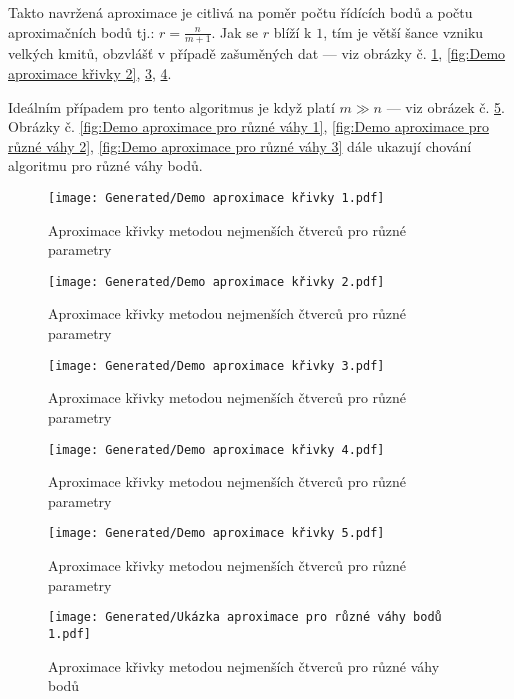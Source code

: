 Takto navržená aproximace je citlivá na poměr počtu řídících bodů a počtu
aproximačních bodů tj.: $r = \frac{n}{m + 1}$. Jak se $r$ blíží k $1$, tím je
větší šance vzniku velkých kmitů, obzvlášť v případě zašuměných dat --- viz
obrázky č. \ref{fig:Demo aproximace křivky 1}, \ref{fig:Demo aproximace křivky
    2}, \ref{fig:Demo aproximace křivky 3}, \ref{fig:Demo aproximace křivky 4}.\par
Ideálním případem pro tento algoritmus je když platí $m \gg n$ --- viz obrázek č.
\ref{fig:Demo aproximace křivky 5}. Obrázky č. \ref{fig:Demo aproximace pro
    různé váhy 1}, \ref{fig:Demo aproximace pro různé váhy 2}, \ref{fig:Demo
    aproximace pro různé váhy 3} dále ukazují chování algoritmu pro různé váhy
bodů.
\begin{imagepage}
    \begin{figure}[H]
        \centering
        \texttt{[image: Generated/Demo aproximace křivky 1.pdf]}
        \caption{Aproximace křivky metodou nejmenších čtverců pro různé parametry}
        \label{fig:Demo aproximace křivky 1}
    \end{figure}
    \begin{figure}[H]
        \centering
        \texttt{[image: Generated/Demo aproximace křivky 2.pdf]}
        \caption{Aproximace křivky metodou nejmenších čtverců pro různé parametry}
        \label{fig:Demo aproximace křivky 2}
    \end{figure}
\end{imagepage}
\begin{imagepage}
    \begin{figure}[H]
        \centering
        \texttt{[image: Generated/Demo aproximace křivky 3.pdf]}
        \caption{Aproximace křivky metodou nejmenších čtverců pro různé parametry}
        \label{fig:Demo aproximace křivky 3}
    \end{figure}
    \begin{figure}[H]
        \centering
        \texttt{[image: Generated/Demo aproximace křivky 4.pdf]}
        \caption{Aproximace křivky metodou nejmenších čtverců pro různé parametry}
        \label{fig:Demo aproximace křivky 4}
    \end{figure}
\end{imagepage}
\begin{imagepage}
    \begin{figure}[H]
        \centering
        \texttt{[image: Generated/Demo aproximace křivky 5.pdf]}
        \caption{Aproximace křivky metodou nejmenších čtverců pro různé parametry}
        \label{fig:Demo aproximace křivky 5}
    \end{figure}
    \begin{figure}[H]
        \centering
        \texttt{[image: Generated/Ukázka aproximace pro různé váhy bodů 1.pdf]}
        \caption{Aproximace křivky metodou nejmenších čtverců pro různé váhy bodů}
        \label{fig:Demo aproximace pro různé váhy 1}
    \end{figure}
\end{imagepage}

